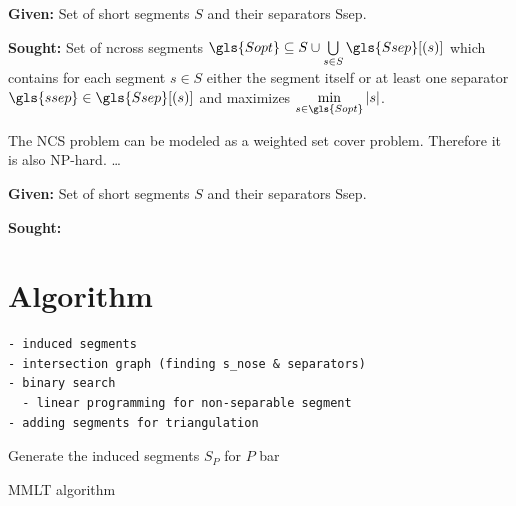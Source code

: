 \begin{problem}
  \hfill
  \begin{labeling}{\hspace{4em}}
    \item[\textbf{Given:}]
      Set of short segments \(S\) and their separators \gls{Ssep}.
    \item[\textbf{Sought:}]
      Set of \gls{ncross} segments \(\gls{Sopt} \subseteq S \cup
      \bigcup\limits_{s \in S} \gls{Ssep}[(s)] \) which contains
      for each segment \(s \in S\) either the segment itself or at
      least one separator \(\gls{ssep} \in \gls{Ssep}[(s)]\) and
      maximizes \(\min\limits_{s \in \gls{Sopt}} |s|\).
  \end{labeling}
\end{problem}

The \gls{NCS} problem can be modeled as a weighted set cover problem. 
Therefore it is also NP-hard. 
\ldots

\begin{problem}
  \hfill
  \begin{labeling}{\hspace{4em}}
    \item[\textbf{Given:}]
      Set of short segments \(S\) and their separators \gls{Ssep}.  
    \item[\textbf{Sought:}]
  \end{labeling}
\end{problem}


\section{Algorithm}

\begin{verbatim}
- induced segments
- intersection graph (finding s_nose & separators)
- binary search
  - linear programming for non-separable segment
- adding segments for triangulation
\end{verbatim}

\begin{algorithm}
\DontPrintSemicolon
{}
Generate the induced segments \(S_P\) for \(P\) \;
bar \;
\caption{\gls{MMLT} algorithm}
\end{algorithm}
